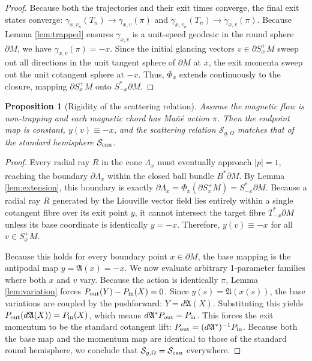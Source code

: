 \documentclass[12pt]{amsart}
\numberwithin{equation}{section}
\newtheorem{proposition}[theorem]{Proposition}
\begin{document}
\begin{proof}
Because both the trajectories and their exit times converge, the final exit states converge: $\gamma_{x,v_n}(T_n) \to \gamma_{x,v}(\pi)$ and $\dot{\gamma}_{x,v_n}(T_n) \to \dot{\gamma}_{x,v}(\pi)$. Because Lemma \ref{lem:trapped} ensures $\gamma_{x,v}$ is a unit-speed geodesic in the round sphere $\partial M$, we have $\gamma_{x,v}(\pi)=-x$.
Since the initial glancing vectors $v \in \partial S_x^+ M$ sweep out all directions in the unit tangent sphere of $\partial M$ at $x$, the exit momenta sweep out the unit cotangent sphere at $-x$. Thus, $\Phi_x$ extends continuously to the closure, mapping $\partial S_x^+ M$ onto $S_{-x}^{*}\partial M$.
\end{proof}

\begin{proposition}[Rigidity of the scattering relation]\label{proposition4.12}
Assume the magnetic flow is non-trapping and each magnetic chord has Ma\~n\'e action $\pi$.
Then the endpoint map is constant, $y(v) \equiv -x$, and the scattering relation $\mathcal{S}_{g,\Omega}$ matches that of the standard hemisphere $\mathcal{S}_{{\rm can}}$.\label{prop:rs}
\end{proposition}

\begin{proof}
Every radial ray $R$ in the cone $\Lambda_x$ must eventually approach $|p| = 1$, reaching the boundary $\partial \Lambda_x$ within the closed ball bundle $\overline{B^*\partial M}$. By Lemma \ref{lem:extension}, this boundary is exactly $\partial \Lambda_x = \Phi_x(\partial S_x^+ M) = S_{-x}^*\partial M$.
Because a radial ray $R$ generated by the Liouville vector field lies entirely within a single cotangent fibre over its exit point $y$, it cannot intersect the target fibre $T_{-x}^*\partial M$ unless its base coordinate is identically $y = -x$. Therefore, $y(v) \equiv -x$ for all $v \in S_x^+ M$.

Because this holds for every boundary point $x \in \partial M$, the base mapping is the antipodal map $y = \mathfrak{A}(x) = -x$.
We now evaluate arbitrary 1-parameter families where both $x$ and $v$ vary. Because the action is identically $\pi$, Lemma \ref{lem:variation} forces $P_{\rm out}(Y) - P_{\rm in}(X) = 0$.
Since $y(s) = \mathfrak{A}(x(s))$, the base variations are coupled by the pushforward: $Y = d\mathfrak{A}(X)$.
Substituting this yields $P_{\rm out}(d\mathfrak{A}(X)) = P_{\rm in}(X)$, which means $d\mathfrak{A}^* P_{\rm out} = P_{\rm in}$. This forces the exit momentum to be the standard cotangent lift: $P_{\rm out} = (d\mathfrak{A}^*)^{-1} P_{\rm in}$.
Because both the base map and the momentum map are identical to those of the standard round hemisphere, we conclude that $\mathcal{S}_{g,\Omega} = \mathcal{S}_{{\rm can}}$ everywhere.
\end{proof}
\end{document}
